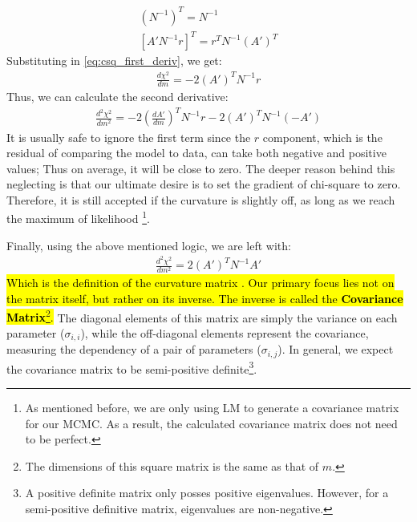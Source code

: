 \documentclass[12pt, TexShade, letterpaper]{report}
\begin{document}
\begin{gather}
    \left(N^{-1}\right)^T = N^{-1}\\
    \left[A' N^{-1} r\right]^T = r^T N^{-1} \left(A'\right)^T
\end{gather}
Substituting in \ref{eq:csq_first_deriv}, we get:
\begin{align}
    \frac{d \chi^2}{dm} = -2 \left(A'\right)^T N^{-1} r
\end{align}
Thus, we can calculate the second derivative:
\begin{align}
    \frac{d^2 \chi^2}{dm^2} = -2 \left(\frac{dA'}{dm}\right)^T N^{-1} r -2 \left(A'\right) ^T N^{-1} \left(-A'\right)
\end{align}
It is usually safe to ignore the first term since the $r$ component, which is the residual of comparing the model to data, can take both negative and positive values; Thus on average, it will be close to zero. The deeper reason behind this neglecting is that our ultimate desire is to set the gradient of chi-square to zero. Therefore, it is still accepted if the curvature is slightly off, as long as we reach the maximum of likelihood \footnote{As mentioned before, we are only using LM to generate a covariance matrix for our MCMC. As a result, the calculated covariance matrix does not need to be perfect.}.\par

Finally, using the above mentioned logic, we are left with:
\begin{align}
         \frac{d^2 \chi^2}{dm^2} = 2 \left(A'\right)^T N^{-1} A' \label{eq:csq_second_deriv}
\end{align}
\hl{Which is the definition of the curvature matrix . Our primary focus lies not on the matrix itself, but rather on its inverse. The inverse is called the \textbf{Covariance Matrix}\footnote{The dimensions of this square matrix is the same as that of $m$.}.} The diagonal elements of this matrix are simply the variance on each parameter ($\sigma_{i, i}$), while the off-diagonal elements represent the covariance, measuring the dependency of a pair of parameters ($\sigma_{i, j}$). In general, we expect the covariance matrix to be semi-positive definite\footnote{A positive definite matrix only posses positive eigenvalues. However, for a semi-positive definitive matrix, eigenvalues are non-negative.}.\par
\end{document}

